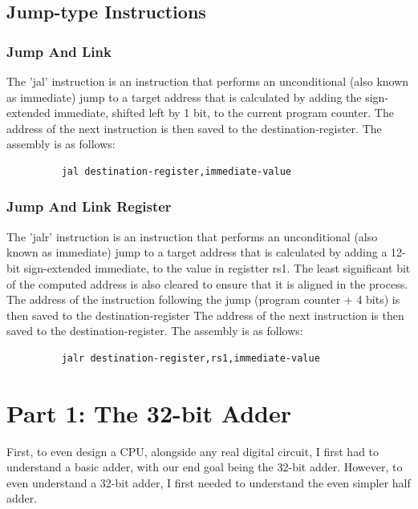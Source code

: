 \subsection{Jump-type Instructions}

\subsubsection{Jump And Link}
\qquad
The 'jal' instruction is an instruction that performs an unconditional (also known as immediate) jump to a target address that is calculated by adding the sign-extended immediate, shifted left by 1 bit, to the current program counter. The address of the next instruction is then saved to the destination-register. The assembly is as follows:
\begin{figure}[!htbp]
    \centering
    \begin{verbatim}
    jal destination-register,immediate-value
    \end{verbatim}
\end{figure}\newline

\subsubsection{Jump And Link Register}
\qquad
The 'jalr' instruction is an instruction that performs an unconditional (also known as immediate) jump to a target address that is calculated by adding a 12-bit sign-extended immediate, to the value in registter rs1. The least significant bit of the computed address is also cleared to ensure that it is aligned in the process. The address of the instruction following the jump (program counter + 4 bits) is then saved to the destination-register The address of the next instruction is then saved to the destination-register. The assembly is as follows:
\begin{figure}[!htbp]
    \centering
    \begin{verbatim}
    jalr destination-register,rs1,immediate-value
    \end{verbatim}
\end{figure}\newline



\newpage
\section{Part 1: The 32-bit Adder}
\qquad
First, to even design a CPU, alongside any real digital circuit, I first had to understand a basic adder, with our end goal being the 32-bit adder. However, to even understand a 32-bit adder, I first needed to understand the even simpler half adder.
